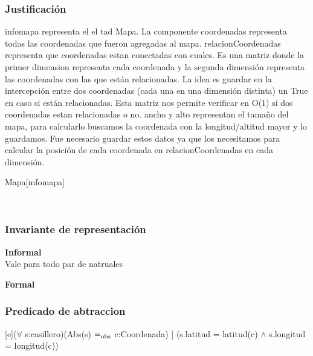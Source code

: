 \begin{Representacion}
\subsubsection{Justificación}
infomapa representa el el tad Mapa. La componente coordenadas representa todas las coordenadas que fueron agregadas al mapa.
relacionCoordenadas representa que coordenadas estan conectadas con cuales. Es una matriz donde la primer dimension representa cada coordenada y la segunda dimensi\'on representa las coordenadas con las que est\'an relacionadas. La idea es guardar en la intercepci\'on entre dos coordenadas (cada una en una dimensi\'on distinta) un True en caso si están relacionadas. Esta matriz nos permite verificar en O(1) si dos coordenadas estan relacionadas o no.
ancho y alto representan el tama\~no del mapa, para calcularlo buscamos la coordenada con la longitud/altitud mayor y lo guardamos. Fue necesario guardar estos datos ya que los necesitamos para calcular la posici\'on de cada coordenada en relacionCoordenadas en cada dimensi\'on.

	\begin{Estructura}{Mapa}[infomapa]
		\begin{Tupla}[infomapa]
			\\
		\end{Tupla}
	\end{Estructura}

\subsubsection{Invariante de representación}

\textbf{Informal}\\

Vale para todo par de natruales

\textbf{Formal}\\


\subsubsection{Predicado de abtraccion}

[e]{($\forall$ s:casillero)(Abs(s) $=_{\mathrm{obs}}$ c:Coordenada) | (s.latitud = latitud(c) $\wedge$ s.longitud = longitud(c))}

\end{Representacion}

